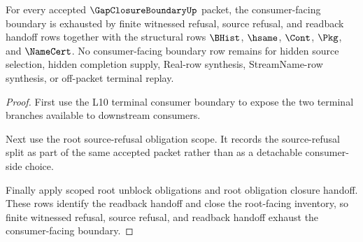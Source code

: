 \begin{theorem}
\label{thm:gap-closure-boundary-finite-refusal-consumer-exhaustion}
For every accepted $\GapClosureBoundaryUp$ packet, the consumer-facing boundary is exhausted by finite witnessed refusal, source refusal, and readback handoff rows together with the structural rows $\BHist$, $\hsame$, $\Cont$, $\Pkg$, and $\NameCert$. No consumer-facing boundary row remains for hidden source selection, hidden completion supply, Real-row synthesis, StreamName-row synthesis, or off-packet terminal replay.
\end{theorem}
\begin{proof}
First use the L10 terminal consumer boundary to expose the two terminal branches available to downstream consumers.

Next use the root source-refusal obligation scope. It records the source-refusal split as part of the same accepted packet rather than as a detachable consumer-side choice.

Finally apply scoped root unblock obligations and root obligation closure handoff. These rows identify the readback handoff and close the root-facing inventory, so finite witnessed refusal, source refusal, and readback handoff exhaust the consumer-facing boundary.
\end{proof}
